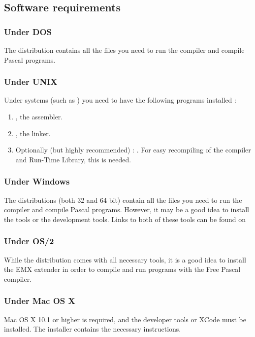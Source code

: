 \subsection{Software requirements}

\subsubsection{Under DOS}
The \dos distribution contains all the files you need to run the compiler
and compile Pascal programs.

\subsubsection{Under UNIX}
Under \unix systems (such as \linux) you need to have the following programs
installed :
\begin{enumerate}
\item \gnu {}, the \gnu assembler.
\item \gnu {}, the \gnu linker.
\item Optionally (but highly recommended) : \gnu {}. For easy
recompiling of the compiler and Run-Time Library, this is needed.
\end{enumerate}

\subsubsection{Under Windows}
The \windows distributions (both 32 and 64 bit) contain all the files you need to run the compiler
and compile Pascal programs. However, it may be a good idea to install
the  tools or the  development tools. Links
to both of these tools can be found on 

\subsubsection{Under OS/2}
While the \fpc distribution comes with all necessary tools, it is a good
idea to install the EMX extender in order to compile and run
programs with the Free Pascal compiler. 

\subsubsection{Under Mac OS X}
Mac OS X 10.1 or higher is required, and the developer tools or XCode
must be installed. The installer contains the necessary instructions.

